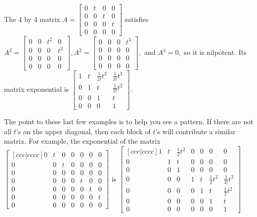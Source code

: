 \documentclass[10pt]{article}
\theoremstyle{plain}
\theoremstyle{box}
\begin{document}
The 4 by 4 matrix $A=
\begin{bmatrix}
 0 & t & 0 & 0 \\
 0 & 0 & t & 0 \\
 0 & 0 & 0 & t \\
 0 & 0 & 0 & 0
\end{bmatrix}
$ satisfies
$A^2 = 
\begin{bmatrix}
 0 & 0 & t^2 & 0 \\
 0 & 0 & 0 & t^2 \\
 0 & 0 & 0 & 0 \\
 0 & 0 & 0 & 0
\end{bmatrix}
,
A^2 = 
\begin{bmatrix}
 0 & 0 & 0 & t^3 \\
 0 & 0 & 0 & 0 \\
 0 & 0 & 0 & 0 \\
 0 & 0 & 0 & 0
\end{bmatrix}
,$ and
$A^4 = 0,$ so it is nilpotent. Its matrix exponential is
$
\begin{bmatrix}
 1 & t & \frac{1}{2!}t^2 & \frac{1}{3!}t^3 \\
 0 & 1 & t & \frac{1}{2!}t^2 \\
 0 & 0 & 1 & t \\
 0 & 0 & 0 & 1
\end{bmatrix}
$. 

The point to these last few examples is to help you see a pattern. If there are not all $t$'s on the upper diagonal, then each block of $t$'s will contribute a similar matrix.  For example, the exponential of the matrix 
$
\begin{bmatrix}[ccc|cccc]
 0 & t & 0 & 0 & 0 & 0 & 0 \\
 0 & 0 & t & 0 & 0 & 0 & 0 \\
 0 & 0 & 0 & 0 & 0 & 0 & 0 \\\hline
 0 & 0 & 0 & 0 & t & 0 & 0 \\
 0 & 0 & 0 & 0 & 0 & t & 0 \\
 0 & 0 & 0 & 0 & 0 & 0 & t \\
 0 & 0 & 0 & 0 & 0 & 0 & 0
\end{bmatrix}
$ is
$
\begin{bmatrix}[ccc|cccc]
 1 & t & \frac{1}{2}t^2 & 0 & 0 & 0 & 0 \\
 0 & 1 & t & 0 & 0 & 0 & 0 \\
 0 & 0 & 1 & 0 & 0 & 0 & 0 \\\hline
 0 & 0 & 0 & 1 & t & \frac{1}{2}t^2 & \frac{1}{3!}t^3 \\
 0 & 0 & 0 & 0 & 1 & t & \frac{1}{2}t^2 \\
 0 & 0 & 0 & 0 & 0 & 1 & t \\
 0 & 0 & 0 & 0 & 0 & 0 & 1
\end{bmatrix}
$
\end{document}
